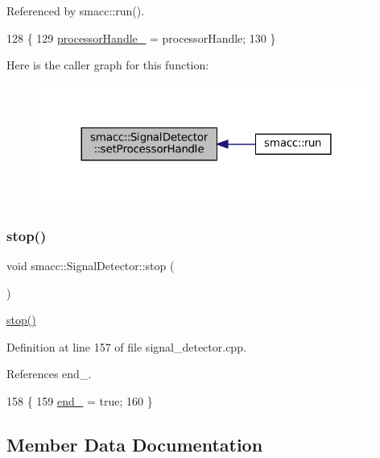 Referenced by smacc\+::run().


\begin{DoxyCode}
128     \{
129         \hyperlink{classsmacc_1_1SignalDetector_a9a77dc9f0e9f8f56dff5e76077abcb78}{processorHandle\_} = processorHandle;
130     \}
\end{DoxyCode}
Here is the caller graph for this function\+:
\nopagebreak
\begin{figure}[H]
\begin{center}
\leavevmode
\includegraphics[width=312pt]{classsmacc_1_1SignalDetector_ac1197a77c32a3b817005391e550ce646_icgraph}
\end{center}
\end{figure}
\mbox{\label{classsmacc_1_1SignalDetector_a536ea005ea4ef4632c0c9c1c62c557a3}} 
\subsubsection{\texorpdfstring{stop()}{stop()}}
{\footnotesize\ttfamily void smacc\+::\+Signal\+Detector\+::stop (\begin{DoxyParamCaption}{ }\end{DoxyParamCaption})}

\hyperlink{classsmacc_1_1SignalDetector_a536ea005ea4ef4632c0c9c1c62c557a3}{stop()} 

Definition at line 157 of file signal\+\_\+detector.\+cpp.



References end\+\_\+.


\begin{DoxyCode}
158     \{
159         \hyperlink{classsmacc_1_1SignalDetector_aaee266393c01693528a2d74b1f2354a2}{end\_} = \textcolor{keyword}{true};
160     \}
\end{DoxyCode}


\subsection{Member Data Documentation}
\mbox{\label{classsmacc_1_1SignalDetector_aaee266393c01693528a2d74b1f2354a2}} 

